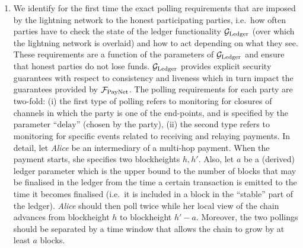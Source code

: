 \begin{enumerate}
\item We identify for the first time the exact polling requirements that are
imposed by the lightning network to the honest participating parties, i.e.\ how
often parties have to check the state of the ledger functionality $\mathcal{G}_{\mathrm{Ledger}}$
(over which the lightning network is overlaid) and how to act depending on what
they see. These requirements are a function of the parameters of $\mathcal{G}_{\mathrm{Ledger}}$ and
ensure that honest parties do not lose funds. $\mathcal{G}_{\mathrm{Ledger}}$ provides explicit
security guarantees with respect to consistency and liveness which in turn
impact the guarantees provided by $\mathcal{F}_{\mathrm{PayNet}}{}$. The polling requirements for
each party are two-fold: (i) the
first type of polling refers to monitoring for closures of channels in which the
party is one of the end-points, and is specified by the parameter ``$\mathrm{delay}$''
(chosen by the party), (ii) the second type refers to monitoring for
specific events related to receiving and relaying payments. In detail,
let \emph{Alice} be an intermediary of a multi-hop payment. When the payment
starts, she specifies two blockheights $h, h'$. Also, let $a$ be a (derived) ledger parameter which is the upper bound
to the number of blocks that may be finalised in the ledger from the time a
certain transaction is emitted to the time it becomes finalised (i.e.\ it is
included in a block in the ``stable'' part of the ledger). \emph{Alice}
should then poll twice while her local view of the chain advances from
blockheight $h$ to blockheight $h' - a$. Moreover, the two pollings should be
separated by a time window that allows the
chain to grow by at least $a$
blocks.


\end{enumerate}
